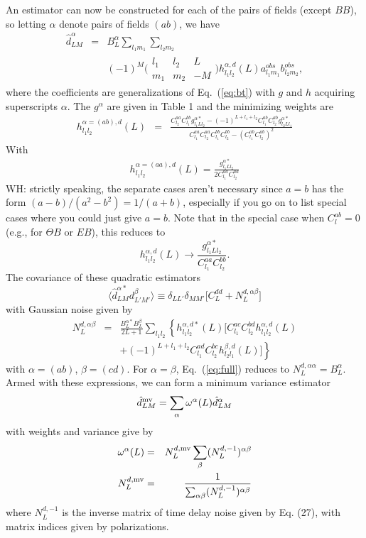 \documentclass[prl,amsmath,amssymb,floatfix,superscriptaddress,nofootinbib,twocolumn]{revtex4-1}
\def\be{\begin{equation}}
\def\ee{\end{equation}}
\def\bea{\begin{eqnarray}}
\def\eea{\end{eqnarray}}
\newcommand{\ec}[1]{Eq.~(\ref{eq:#1})}
\newcommand{\eql}[1]{\label{eq:#1}}
\newcommand{\wh}[1]{{\color{red} WH: #1}}
\begin{document}
An estimator can now be constructed for each of the pairs of fields (except $BB$), so letting $\alpha$ denote pairs of fields $(ab)$, we have
\bea
\hat{d}^{\alpha}_{LM} &=&\nonumber B_{L}^{\alpha}\sum_{l_{1}m_{1}}\sum_{l_{2}m_{2}} \\
&& (-1)^{M}\bigl(\begin{smallmatrix} l_1 & l_2 & L \\ m_1 & m_2 & -M  \end{smallmatrix}\bigr) h^{\alpha,d}_{l_{1}l_{2}}(L) a^{obs}_{l_{1}m_{1}}b^{obs}_{l_{2}m_{2}} ,
\eea
where the coefficients are generalizations of \ec{bt} with $g$ and $h$ acquiring superscripts $\alpha$. The $g^\alpha$ are given in Table 1 and the minimizing weights are
\bea
h^{\alpha=(ab),d}_{l_{1}l_{2}}(L) 
&=& \frac{C_{l_{2}}^{aa}C_{l_{1}}^{bb}g^{\alpha*}_{l_{1}Ll_{2}}-(-1)^{L+l_{1}+l_{2}}C_{l_{1}}^{ab}C_{l_{2}}^{ab}g^{\alpha*}_{l_{2}Ll_{1}}}{C_{l_{1}}^{aa}C_{l_{2}}^{aa}C_{l_{1}}^{bb}C_{l_{2}}^{bb}-(C_{l_{1}}^{ab}C_{l_{2}}^{ab})^{2}}
\eea
With 
\bea 
h_{l_{1}l_{2}}^{\alpha=(aa),d}(L)= \frac{g_{l_{1}Ll_{2}}^{\alpha*}}{2C_{l_{1}}^{aa}C_{l_{2}}^{aa}}
\eea 
\wh{strictly speaking, the separate cases aren't necessary since $a=b$ has the form $(a-b)/(a^2-b^2) = 1/(a+b)$, especially if you go on to list special cases where you could just give $a=b$.}
Note that in the special case when $C_{l}^{ab}=0$ (e.g., for $\Theta B$ or $EB$), this reduces to 
\be
h^{\alpha,d}_{l_{1}l_{2}}(L) \rightarrow \frac{g^{\alpha *}_{l_{1}Ll_{2}}}{C_{l_{1}}^{aa}C_{l_{2}}^{bb}}. 
\ee
The covariance of these quadratic estimators
\be
\langle \hat{d}^{\alpha*}_{LM}d^{\beta}_{L'M'}\rangle \equiv \delta_{LL'}\delta_{MM'}\big[ C_{L}^{dd}+N_{L}^{d,\alpha \beta} \big]
\ee
with Gaussian noise given by
\bea
N_{L}^{d,\alpha\beta}&=&\frac{B_{L}^{\alpha*}B_{L}^{\beta}}{2L+1}\sum_{l_{1}l_{2}}  \left\{ h_{l_{1}l_{2}}^{\alpha,d*} (L)\big[ C_{l_{1}}^{ac}C_{l_{2}}^{bd}h_{l_{1}l_{2}}^{\alpha,d}(L)\right. \nonumber \\
&&\left. +(-1)^{L+l_{1}+l_{2}}C_{l_{1}}^{ad}C_{l_{2}}^{bc} h_{l_{2}l_{1}}^{\beta,d}(L)  \big]\right\}\eql{full}
\eea
with $\alpha=(ab)$, $\beta=(cd)$. For $\alpha=\beta$, \ec{full} reduces to $N_{L}^{d,\alpha\alpha}=B_{L}^{\alpha}$.
Armed with these expressions, we can form a minimum variance estimator
\be
\hat{d}^{\rm mv}_{LM} = \sum_{\alpha}\omega^{\alpha}(L)\hat{d}^{\alpha}_{LM}
\ee
with weights and variance give by
\bea
\omega^{\alpha}(L) & =&N^{d,\rm mv}_{L} \sum_{\beta}(N_{L}^{d,-1})^{\alpha \beta} \\
N^{d,\rm mv}_{L} &=& \frac{1}{\sum_{\alpha\beta} (N_{L}^{d,-1})^{\alpha \beta}}
\eea
where $N_{L}^{d,-1}$ is the inverse matrix of time delay noise given by Eq. (27), with matrix indices given by polarizations. 
\end{document}
